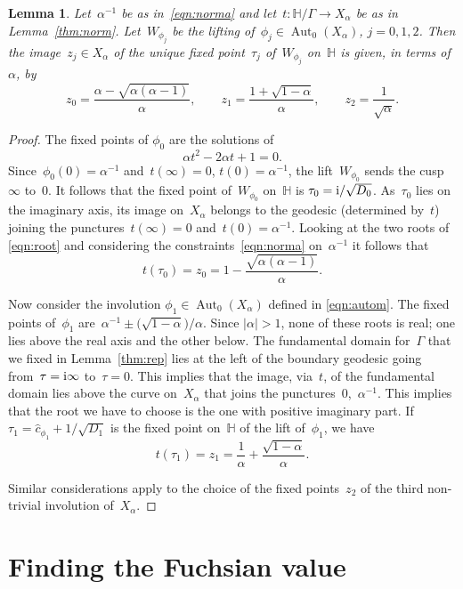 \documentclass[pdftex]{sigma}
\newcommand{\Po}{\mathbb{H}}
\numberwithin{equation}{section}
\newtheorem{Lemma}[Theorem]{Lemma}
\begin{document}
\begin{Lemma}\label{thm:fixed}
Let~$\alpha^{-1}$ be as in~\eqref{eqn:norma} and let~$t\colon\Po/\Gamma\to X_\alpha$ be as in Lemma~{\rm \ref{thm:norm}}.
Let~$W_{\phi_j}$ be the lifting of~$\phi_j\in\operatorname{Aut}_0(X_\alpha)$, $j=0,1,2$. Then the image~$z_j\in X_\alpha$ of the unique fixed point~$\tau_j$ of~$W_{\phi_j}$ on~$\Po$ is given, in terms of~$\alpha$, by
\[
z_0 =\frac{\alpha-\sqrt{\alpha(\alpha-1)}}{\alpha} ,\qquad z_1=\frac{1+\sqrt{1-\alpha}}{\alpha} ,\qquad z_2 =\frac{1}{\sqrt{\alpha}} .
\]
\end{Lemma}
\begin{proof}
The fixed points of $\phi_0$ are the solutions of
\begin{equation}
\label{eqn:root}
\alpha{t}^2-2\alpha{t}+1=0.
\end{equation}
Since~$\phi_0(0)=\alpha^{-1}$ and~$t(\infty)=0$, $t(0)=\alpha^{-1}$, the lift~$W_{\phi_0}$ sends the cusp~$\infty$ to~$0$. It follows that the fixed point of~$W_{\phi_0}$ on~$\Po$ is $\tau_{0}={\rm i}/\sqrt{D_0}$. As~$\tau_{0}$ lies on the imaginary axis, its image on~$X_\alpha$ belongs to the geodesic (determined by~$t$) joining the punctures~$t(\infty)=0$ and~$t(0)=\alpha^{-1}$. Looking at the two roots of \eqref{eqn:root} and considering the constraints~\eqref{eqn:norma} on~$\alpha^{-1}$ it follows that
\[
t(\tau_{0})= z_0 =1-\frac{\sqrt{\alpha(\alpha-1)}}{\alpha}.
\]

Now consider the involution $\phi_1\in\operatorname{Aut}_0(X_\alpha)$ defined in \eqref{eqn:autom}.
The fixed points of~$\phi_1$ are~$\alpha^{-1}\pm\bigl(\sqrt{1-\alpha}\bigr)/\alpha$. Since $|\alpha|>1$, none of these roots is real; one lies above the real axis and the other below. The fundamental domain for~$\Gamma$ that we fixed in Lemma~\ref{thm:rep} lies at the left of the boundary geodesic going from~$\tau={\rm i}\infty$ to~$\tau=0$. This implies that the image, via~$t$, of the fundamental domain lies above the curve on~$X_\alpha$ that joins the punctures~$0$,~$\alpha^{-1}$. This implies that the root we have to choose is the one with positive imaginary part. If~$\tau_{1}=\hat{c}_{\phi_1}+1/\sqrt{D_1}$ is the fixed point on~$\Po$ of the lift of~$\phi_1$, we have
\[
t(\tau_{1}) = z_1 = \frac{1}{\alpha}+\frac{\sqrt{1-\alpha}}{\alpha}.
\]

Similar considerations apply to the choice of the fixed points~$z_2$ of the third non-trivial involution of~$X_\alpha$.
\end{proof}

\section{Finding the Fuchsian value}\label{sec:find}
\end{document}

